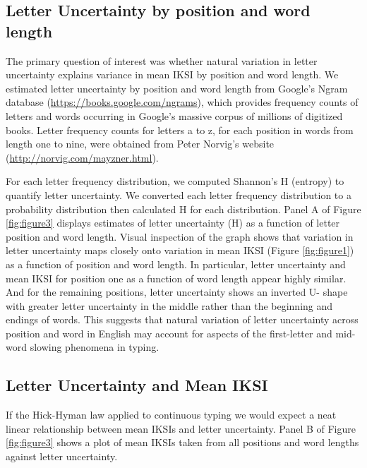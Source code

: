 \documentclass[,man,floatsintext]{apa6}
\begin{document}
\hypertarget{letter-uncertainty-by-position-and-word-length}{%
\subsection{Letter Uncertainty by position and word length}\label{letter-uncertainty-by-position-and-word-length}}

The primary question of interest was whether natural variation in letter uncertainty explains variance in mean IKSI by position and word length. We estimated letter uncertainty by position and word length from Google's Ngram database (\url{https://books.google.com/ngrams}), which provides frequency counts of letters and words occurring in Google's massive corpus of millions of digitized books. Letter frequency counts for letters a to z, for each position in words from length one to nine, were obtained from Peter Norvig's website (\url{http://norvig.com/mayzner.html}).

For each letter frequency distribution, we computed Shannon's H (entropy) to quantify letter uncertainty. We converted each letter frequency distribution to a probability distribution then calculated H for each distribution. Panel A of Figure \ref{fig:figure3} displays estimates of letter uncertainty (H) as a function of letter position and word length. Visual inspection of the graph shows that variation in letter uncertainty maps closely onto variation in mean IKSI (Figure \ref{fig:figure1}) as a function of position and word length. In particular, letter uncertainty and mean IKSI for position one as a function of word length appear highly similar. And for the remaining positions, letter uncertainty shows an inverted U- shape with greater letter uncertainty in the middle rather than the beginning and endings of words. This suggests that natural variation of letter uncertainty across position and word in English may account for aspects of the first-letter and mid-word slowing phenomena in typing.

\hypertarget{letter-uncertainty-and-mean-iksi}{%
\subsection{Letter Uncertainty and Mean IKSI}\label{letter-uncertainty-and-mean-iksi}}

If the Hick-Hyman law applied to continuous typing we would expect a neat linear relationship between mean IKSIs and letter uncertainty. Panel B of Figure \ref{fig:figure3} shows a plot of mean IKSIs taken from all positions and word lengths against letter uncertainty.
\end{document}
